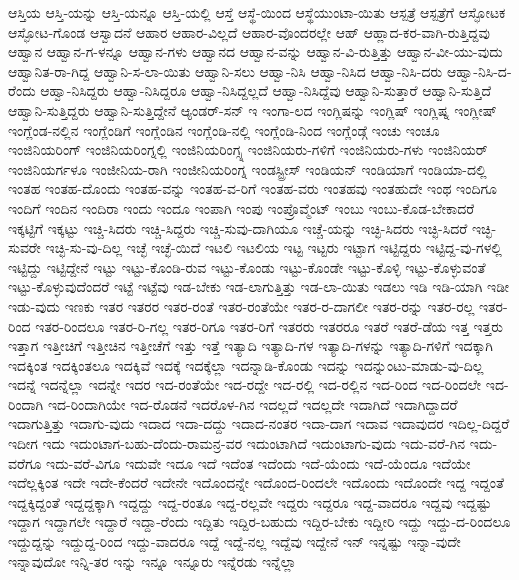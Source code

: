 {ಆಸ್ತಿಯ
ಆಸ್ತಿ-ಯನ್ನು
ಆಸ್ತಿ-ಯನ್ನೂ
ಆಸ್ತಿ-ಯಲ್ಲಿ
ಆಸ್ತೆ
ಆಸ್ಥೆ-ಯಿಂದ
ಆಸ್ಥೆಯುಂಟಾ-ಯಿತು
ಆಸ್ಪತ್ರೆ
ಆಸ್ಪತ್ರೆಗೆ
ಆಸ್ಫೋಟಕ
ಆಸ್ಫೋಟ-ಗೊಂಡ
ಆಸ್ವಾದನೆ
ಆಹಾರ
ಆಹಾರ-ವಿಲ್ಲದೆ
ಆಹಾರ-ವೊಂದರಲ್ಲೇ
ಆಹ್
ಆಹ್ಲಾದ-ಕರ-ವಾಗಿ-ರುತ್ತಿದ್ದವು
ಆಹ್ವಾನ
ಆಹ್ವಾನ-ಗ-ಳನ್ನೂ
ಆಹ್ವಾನ-ಗಳು
ಆಹ್ವಾನದ
ಆಹ್ವಾನ-ವನ್ನು
ಆಹ್ವಾನ-ವಿ-ರುತ್ತಿತ್ತು
ಆಹ್ವಾನ-ವೀ-ಯು-ವುದು
ಆಹ್ವಾನಿತ-ರಾ-ಗಿದ್ದ
ಆಹ್ವಾನಿ-ಸ-ಲಾ-ಯಿತು
ಆಹ್ವಾನಿ-ಸಲು
ಆಹ್ವಾ-ನಿಸಿ
ಆಹ್ವಾ-ನಿಸಿದ
ಆಹ್ವಾ-ನಿಸಿ-ದರು
ಆಹ್ವಾ-ನಿಸಿ-ದ-ರೆಂದು
ಆಹ್ವಾ-ನಿಸಿದ್ದರು
ಆಹ್ವಾ-ನಿಸಿದ್ದರೂ
ಆಹ್ವಾ-ನಿಸಿದ್ದಲ್ಲದೆ
ಆಹ್ವಾ-ನಿಸಿದ್ದೆವು
ಆಹ್ವಾನಿ-ಸುತ್ತಾರೆ
ಆಹ್ವಾನಿ-ಸುತ್ತಿದೆ
ಆಹ್ವಾನಿ-ಸುತ್ತಿದ್ದರು
ಆಹ್ವಾನಿ-ಸುತ್ತಿದ್ದೇನೆ
ಆ್ಯಂಡರ್-ಸನ್
ಇ
ಇಂಗಾ-ಲದ
ಇಂಗ್ಲಿಷನ್ನು
ಇಂಗ್ಲಿಷ್
ಇಂಗ್ಲಿಷ್ನ
ಇಂಗ್ಲೀಷ್
ಇಂಗ್ಲೆಂಡ-ನಲ್ಲಿನ
ಇಂಗ್ಲೆಂಡಿಗೆ
ಇಂಗ್ಲೆಂಡಿನ
ಇಂಗ್ಲೆಂಡಿ-ನಲ್ಲಿ
ಇಂಗ್ಲೆಂಡಿ-ನಿಂದ
ಇಂಗ್ಲೆಂಡ್ಗೆ
ಇಂಚು
ಇಂಚೂ
ಇಂಜಿನಿಯರಿಂಗ್
ಇಂಜಿನಿಯರಿಂಗ್ನಲ್ಲಿ
ಇಂಜಿನಿಯರಿಂಗ್ಸ್ನ
ಇಂಜಿನಿಯರು-ಗಳಿಗೆ
ಇಂಜಿನಿಯರು-ಗಳು
ಇಂಜಿನಿಯರ್
ಇಂಜಿನಿಯರ್ಗಳೂ
ಇಂಜೀನಿಯ-ರಾಗಿ
ಇಂಜೀನಿಯರಿಂಗ್ನ
ಇಂಡಸ್ಟ್ರೀಸ್
ಇಂಡಿಯನ್
ಇಂಡಿಯಾಗೆ
ಇಂಡಿಯಾ-ದಲ್ಲಿ
ಇಂತಹ
ಇಂತಹ-ದೊಂದು
ಇಂತಹ-ವನ್ನು
ಇಂತಹ-ವ-ರಿಗೆ
ಇಂತಹ-ವರು
ಇಂತಹವು
ಇಂತಹುದೇ
ಇಂಥ
ಇಂದಿಗೂ
ಇಂದಿಗೆ
ಇಂದಿನ
ಇಂದಿರಾ
ಇಂದು
ಇಂದೂ
ಇಂಪಾಗಿ
ಇಂಪು
ಇಂಪ್ರೊವ್ಮೆಂಟ್
ಇಂಬು
ಇಂಬು-ಕೊಡ-ಬೇಕಾದರೆ
ಇಕ್ಕಟ್ಟಿಗೆ
ಇಕ್ಕಟ್ಟು
ಇಚ್ಚಿ-ಸಿದರು
ಇಚ್ಚಿ-ಸಿದ್ದರು
ಇಚ್ಚಿ-ಸುವು-ದಾಗಿಯೂ
ಇಚ್ಚೆ-ಯನ್ನು
ಇಚ್ಛಿ-ಸಿದರು
ಇಚ್ಛಿ-ಸಿದರೆ
ಇಚ್ಛಿ-ಸುವರೇ
ಇಚ್ಛಿ-ಸು-ವು-ದಿಲ್ಲ
ಇಚ್ಛೆ
ಇಚ್ಛೆ-ಯಿದೆ
ಇಟಲಿ
ಇಟಲಿಯ
ಇಟ್ಟ
ಇಟ್ಟರು
ಇಟ್ಟಾಗ
ಇಟ್ಟಿದ್ದರು
ಇಟ್ಟಿದ್ದ-ವು-ಗಳಲ್ಲಿ
ಇಟ್ಟಿದ್ದು
ಇಟ್ಟಿದ್ದೇನೆ
ಇಟ್ಟು
ಇಟ್ಟು-ಕೊಂಡಿ-ರುವ
ಇಟ್ಟು-ಕೊಂಡು
ಇಟ್ಟು-ಕೊಂಡೇ
ಇಟ್ಟು-ಕೊಳ್ಳಿ
ಇಟ್ಟು-ಕೊಳ್ಳುವಂತೆ
ಇಟ್ಟು-ಕೊಳ್ಳುವುದೆಂದರೆ
ಇಟ್ಟೆ
ಇಟ್ಟೆವು
ಇಡ-ಬೇಕು
ಇಡ-ಲಾಗುತ್ತಿತ್ತು
ಇಡ-ಲಾ-ಯಿತು
ಇಡಲು
ಇಡಿ
ಇಡಿ-ಯಾಗಿ
ಇಡೀ
ಇಡು-ವುದು
ಇಣಕು
ಇತರ
ಇತರರ
ಇತರ-ರಂತೆ
ಇತರ-ರಂತೆಯೇ
ಇತರ-ರ-ದಾಗಲೀ
ಇತರ-ರನ್ನು
ಇತರ-ರಲ್ಲ
ಇತರ-ರಿಂದ
ಇತರ-ರಿಂದಲೂ
ಇತರ-ರಿ-ಗಲ್ಲ
ಇತರ-ರಿಗೂ
ಇತರ-ರಿಗೆ
ಇತರರು
ಇತರರೂ
ಇತರೆ
ಇತರೆ-ಡೆಯ
ಇತ್ತ
ಇತ್ತರು
ಇತ್ತಾಗ
ಇತ್ತೀಚಿಗೆ
ಇತ್ತೀಚಿನ
ಇತ್ತೀಚೆಗೆ
ಇತ್ತು
ಇತ್ತೆ
ಇತ್ಯಾದಿ
ಇತ್ಯಾದಿ-ಗಳ
ಇತ್ಯಾದಿ-ಗಳನ್ನು
ಇತ್ಯಾದಿ-ಗಳಿಗೆ
ಇದಕ್ಕಾಗಿ
ಇದಕ್ಕಿಂತ
ಇದಕ್ಕಿಂತಲೂ
ಇದಕ್ಕಿವೆ
ಇದಕ್ಕೆ
ಇದಕ್ಕೆಲ್ಲಾ
ಇದನ್ನಾಡಿ-ಕೊಂಡು
ಇದನ್ನು
ಇದನ್ನುಂಟು-ಮಾಡು-ವು-ದಿಲ್ಲ
ಇದನ್ನೆ
ಇದನ್ನೆಲ್ಲಾ
ಇದನ್ನೇ
ಇದರ
ಇದ-ರಂತೆಯೇ
ಇದ-ರದ್ದೇ
ಇದ-ರಲ್ಲಿ
ಇದ-ರಲ್ಲಿನ
ಇದ-ರಿಂದ
ಇದ-ರಿಂದಲೇ
ಇದ-ರಿಂದಾಗಿ
ಇದ-ರಿಂದಾಗಿಯೇ
ಇದ-ರೊಡನೆ
ಇದರೊಳ-ಗಿನ
ಇದಲ್ಲದೆ
ಇದಲ್ಲದೇ
ಇದಾಗಿದೆ
ಇದಾಗಿದ್ದಾದರೆ
ಇದಾಗುತ್ತಿತ್ತು
ಇದಾಗು-ವುದು
ಇದಾದ
ಇದಾ-ದದ್ದು
ಇದಾದ-ನಂತರ
ಇದಾ-ದಾಗ
ಇದಾವ
ಇದಾವುದರ
ಇದಿಲ್ಲ-ದಿದ್ದರೆ
ಇದೀಗ
ಇದು
ಇದುಂಟಾಗ-ಬಹು-ದೆಂದು-ರಾಮನ್ರ-ವರ
ಇದುಂಟಾಗಿದೆ
ಇದುಂಟಾಗು-ವುದು
ಇದು-ವರೆ-ಗಿನ
ಇದು-ವರೆಗೂ
ಇದು-ವರೆ-ವಿಗೂ
ಇದುವೇ
ಇದೂ
ಇದೆ
ಇದೆಂತ
ಇದೆಂದು
ಇದೆ-ಯೆಂದು
ಇದೆ-ಯೆಂದೂ
ಇದೆಯೇ
ಇದೆಲ್ಲಕ್ಕಿಂತ
ಇದೇ
ಇದೇ-ಕೆಂದರೆ
ಇದೇನೇ
ಇದೊಂದನ್ನೇ
ಇದೊಂದ-ರಿಂದಲೇ
ಇದೊಂದು
ಇದೊಂದೇ
ಇದ್ದ
ಇದ್ದಂತೆ
ಇದ್ದಕ್ಕಿದ್ದಂತೆ
ಇದ್ದದ್ದಕ್ಕಾಗಿ
ಇದ್ದದ್ದು
ಇದ್ದ-ರಂತೂ
ಇದ್ದ-ರಲ್ಲವೇ
ಇದ್ದರು
ಇದ್ದರೂ
ಇದ್ದ-ವಾದರೂ
ಇದ್ದವು
ಇದ್ದಷ್ಟು
ಇದ್ದಾಗ
ಇದ್ದಾಗಲೇ
ಇದ್ದಾರೆ
ಇದ್ದಾ-ರೆಂದು
ಇದ್ದಿತು
ಇದ್ದಿರ-ಬಹುದು
ಇದ್ದಿರ-ಬೇಕು
ಇದ್ದೀರಿ
ಇದ್ದು
ಇದ್ದು-ದ-ರಿಂದಲೂ
ಇದ್ದುದ್ದನ್ನು
ಇದ್ದುದ್ದ-ರಿಂದ
ಇದ್ದು-ವಾದರೂ
ಇದ್ದೆ
ಇದ್ದೆ-ನಲ್ಲ
ಇದ್ದೆವು
ಇದ್ದೇನೆ
ಇನ್
ಇನ್ನಷ್ಟು
ಇನ್ನಾ-ವುದೇ
ಇನ್ನಾವುದೋ
ಇನ್ನಿ-ತರ
ಇನ್ನು
ಇನ್ನೂ
ಇನ್ನೂರು
ಇನ್ನೆರಡು
ಇನ್ನೆಲ್ಲಾ
}

